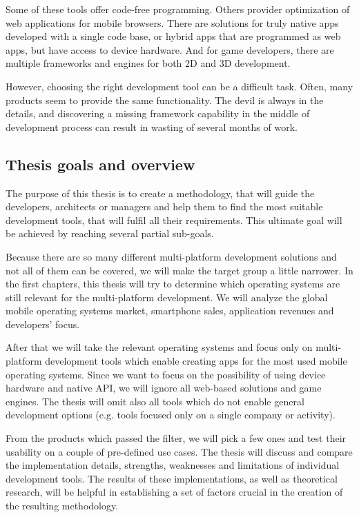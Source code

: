 \documentclass[english,master,public,dept460,male,cpdeclaration,oneside]{diploma}
\begin{document}
Some of these tools offer code-free programming. Others provider optimization of web applications for mobile browsers. There are solutions for truly native apps developed with a single code base, or hybrid apps that are programmed as web apps, but have access to device hardware. And for game developers, there are multiple frameworks and engines for both 2D and 3D development. 

However, choosing the right development tool can be a difficult task. Often, many products seem to provide the same functionality. The devil is always in the details, and discovering a missing framework capability in the middle of development process can result in wasting of several months of work. 

\subsection{Thesis goals and overview}
The purpose of this thesis is to create a methodology, that will guide the developers, architects or managers and help them to find the most suitable development tools, that will fulfil all their requirements. This ultimate goal will be achieved by reaching several partial sub-goals.

Because there are so many different multi-platform development solutions and not all of them can be covered, we will make the target group a little narrower. In the first chapters, this thesis will try to determine which operating systems are still relevant for the multi-platform development. We will analyze the global mobile operating systems market, smartphone sales, application revenues and developers’ focus. 

After that we will take the relevant operating systems and focus only on multi-platform development tools which enable creating apps for the most used mobile operating systems. Since we want to focus on the possibility of using device hardware and native API, we will ignore all web-based solutions and game engines. The thesis will omit also all tools which do not enable general development options (e.g. tools focused only on a single company or activity).

From the products which passed the filter, we will pick a few ones and test their usability on a couple of pre-defined use cases. The thesis will discuss and compare the implementation details, strengths, weaknesses and limitations of individual development tools. The results of these implementations, as well as theoretical research, will be helpful in establishing a set of factors crucial in the creation of the resulting methodology.
\end{document}
